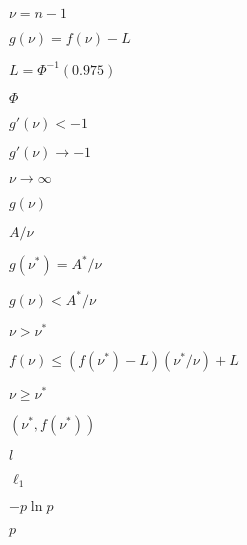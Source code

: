 \documentclass{article}
\begin{document}
$\nu = n - 1$
\pagebreak

$g(\nu) = f(\nu)
 - L$
\pagebreak

$L = \Phi^{-1}(0.975)$
\pagebreak

$\Phi$
\pagebreak

$g'(\nu) < -1$
\pagebreak

$g'(\nu) \to -1$
\pagebreak

$\nu \to
 \infty$
\pagebreak

$g(\nu)$
\pagebreak

$A/\nu$
\pagebreak

$g(\nu^*) = A^*/\nu$
\pagebreak

$g(\nu) < A^*/\nu$
\pagebreak

$\nu > \nu^*$
\pagebreak

$f(\nu) \le (f(\nu^*) - L) (\nu^* / \nu) + L$
\pagebreak

$\nu \ge
 \nu^*$
\pagebreak

$(\nu^*, f(\nu^*))$
\pagebreak

$l$
\pagebreak

$ \ell_1 $
\pagebreak

$ - p \ln p$
\pagebreak

$p$
\pagebreak
\end{document}
